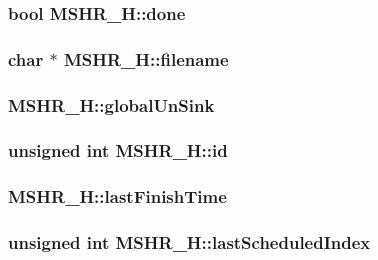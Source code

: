 \hypertarget{classMSHR__H_4cd1713ebd3ab9038ed231781b4bc36a}{
\subsubsection[{done}]{\setlength{\rightskip}{0pt plus 5cm}bool {\bf MSHR\_\-H::done}}}
\label{classMSHR__H_4cd1713ebd3ab9038ed231781b4bc36a}


\hypertarget{classMSHR__H_1121ad69747b53dbe515b58094ac7f08}{
\subsubsection[{filename}]{\setlength{\rightskip}{0pt plus 5cm}char $\ast$ {\bf MSHR\_\-H::filename}}}
\label{classMSHR__H_1121ad69747b53dbe515b58094ac7f08}


\hypertarget{classMSHR__H_08f7e602a70bcf8d0e991d46e19265a2}{
\subsubsection[{globalUnSink}]{ {\bf MSHR\_\-H::globalUnSink}}}
\label{classMSHR__H_08f7e602a70bcf8d0e991d46e19265a2}


\hypertarget{classMSHR__H_97b745c7aeca64268c19411dd6ba5354}{
\subsubsection[{id}]{\setlength{\rightskip}{0pt plus 5cm}unsigned int {\bf MSHR\_\-H::id}}}
\label{classMSHR__H_97b745c7aeca64268c19411dd6ba5354}


\hypertarget{classMSHR__H_adfd06c0a14ec47c72e3b3e0c436d62e}{
\subsubsection[{lastFinishTime}]{ {\bf MSHR\_\-H::lastFinishTime}}}
\label{classMSHR__H_adfd06c0a14ec47c72e3b3e0c436d62e}


\hypertarget{classMSHR__H_fd269df00bf476b2b151516b64cf7388}{
\subsubsection[{lastScheduledIndex}]{\setlength{\rightskip}{0pt plus 5cm}unsigned int {\bf MSHR\_\-H::lastScheduledIndex}}}
\label{classMSHR__H_fd269df00bf476b2b151516b64cf7388}


